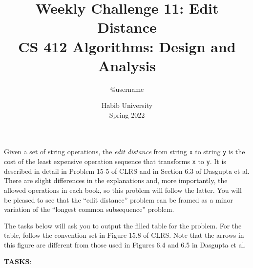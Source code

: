 \documentclass[a4paper]{exam}
\title{Weekly Challenge 11: Edit Distance\\CS 412 Algorithms: Design and Analysis}
\author{@username}  %
\date{Habib University\\Spring 2022}
\begin{document}
\maketitle

\begin{questions}
  

  Given a set of string operations, the \textit{edit distance} from string \texttt{x} to string \texttt{y} is the cost of the least expensive operation sequence that transforms \texttt{x} to \texttt{y}. It is described in detail in Problem 15-5 of CLRS and in Section 6.3 of Dasgupta et al. There are slight differences in the explanations and, more importantly, the allowed operations in each book, so this problem will follow the latter. You will be pleased to see that the ``edit distance'' problem can be framed as a minor variation of the ``longest common subsequence'' problem.

  The tasks below will ask you to output the filled table for the problem. For the table, follow the convention set in Figure 15.8 of CLRS. Note that the arrows in this figure are different from those used in Figures 6.4 and 6.5 in Dasgupta et al. 

  \textbf{TASKS}:
 
  \begin{solution}
  \end{solution}
\end{questions}
\end{document}
